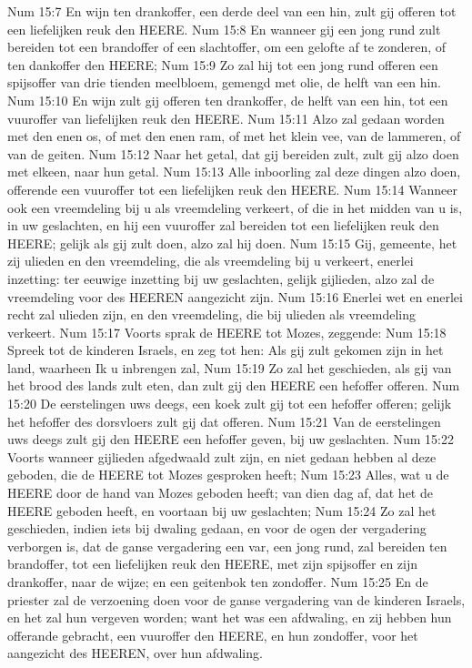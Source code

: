 Num 15:7  En wijn ten drankoffer, een derde deel van een hin, zult gij offeren tot een liefelijken reuk den HEERE.
Num 15:8  En wanneer gij een jong rund zult bereiden tot een brandoffer of een slachtoffer, om een gelofte af te zonderen, of ten dankoffer den HEERE;
Num 15:9  Zo zal hij tot een jong rund offeren een spijsoffer van drie tienden meelbloem, gemengd met olie, de helft van een hin.
Num 15:10  En wijn zult gij offeren ten drankoffer, de helft van een hin, tot een vuuroffer van liefelijken reuk den HEERE.
Num 15:11  Alzo zal gedaan worden met den enen os, of met den enen ram, of met het klein vee, van de lammeren, of van de geiten.
Num 15:12  Naar het getal, dat gij bereiden zult, zult gij alzo doen met elkeen, naar hun getal.
Num 15:13  Alle inboorling zal deze dingen alzo doen, offerende een vuuroffer tot een liefelijken reuk den HEERE.
Num 15:14  Wanneer ook een vreemdeling bij u als vreemdeling verkeert, of die in het midden van u is, in uw geslachten, en hij een vuuroffer zal bereiden tot een liefelijken reuk den HEERE; gelijk als gij zult doen, alzo zal hij doen.
Num 15:15  Gij, gemeente, het zij ulieden en den vreemdeling, die als vreemdeling bij u verkeert, enerlei inzetting: ter eeuwige inzetting bij uw geslachten, gelijk gijlieden, alzo zal de vreemdeling voor des HEEREN aangezicht zijn.
Num 15:16  Enerlei wet en enerlei recht zal ulieden zijn, en den vreemdeling, die bij ulieden als vreemdeling verkeert.
Num 15:17  Voorts sprak de HEERE tot Mozes, zeggende:
Num 15:18  Spreek tot de kinderen Israels, en zeg tot hen: Als gij zult gekomen zijn in het land, waarheen Ik u inbrengen zal,
Num 15:19  Zo zal het geschieden, als gij van het brood des lands zult eten, dan zult gij den HEERE een hefoffer offeren.
Num 15:20  De eerstelingen uws deegs, een koek zult gij tot een hefoffer offeren; gelijk het hefoffer des dorsvloers zult gij dat offeren.
Num 15:21  Van de eerstelingen uws deegs zult gij den HEERE een hefoffer geven, bij uw geslachten.
Num 15:22  Voorts wanneer gijlieden afgedwaald zult zijn, en niet gedaan hebben al deze geboden, die de HEERE tot Mozes gesproken heeft;
Num 15:23  Alles, wat u de HEERE door de hand van Mozes geboden heeft; van dien dag af, dat het de HEERE geboden heeft, en voortaan bij uw geslachten;
Num 15:24  Zo zal het geschieden, indien iets bij dwaling gedaan, en voor de ogen der vergadering verborgen is, dat de ganse vergadering een var, een jong rund, zal bereiden ten brandoffer, tot een liefelijken reuk den HEERE, met zijn spijsoffer en zijn drankoffer, naar de wijze; en een geitenbok ten zondoffer.
Num 15:25  En de priester zal de verzoening doen voor de ganse vergadering van de kinderen Israels, en het zal hun vergeven worden; want het was een afdwaling, en zij hebben hun offerande gebracht, een vuuroffer den HEERE, en hun zondoffer, voor het aangezicht des HEEREN, over hun afdwaling.

